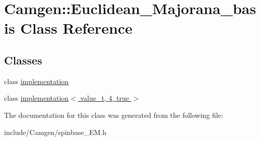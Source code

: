 \hypertarget{a00137}{}\section{Camgen\+:\+:Euclidean\+\_\+\+Majorana\+\_\+basis Class Reference}
\label{a00137}
\subsection*{Classes}
\begin{DoxyCompactItemize}
\item 
class \hyperlink{a00287}{implementation}
\item 
class \hyperlink{a00302}{implementation$<$ value\+\_\+t, 4, true $>$}
\end{DoxyCompactItemize}


The documentation for this class was generated from the following file\+:\begin{DoxyCompactItemize}
\item 
include/\+Camgen/spinbase\+\_\+\+E\+M.\+h\end{DoxyCompactItemize}
